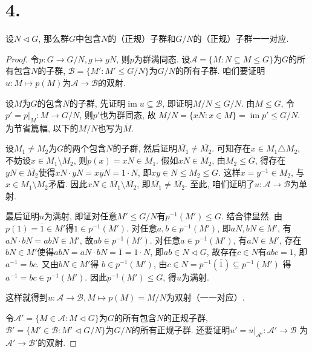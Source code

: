 \documentclass[12pt, a4paper, fontset=windows]{ctexart}
\newcommand{\cl}[1]{\overline{#1}} %
\newcommand{\im}{\operatorname{im}}
\newcommand{\kh}[1]{（{#1}）} %
\begin{document}
\section*{4.}
\label{group-correspond}

设$N\lhd G$, 那么群$G$中包含$N$的\kh{正规}子群和$G/N$的\kh{正规}子群一一对应. 

\begin{proof}
令$p:G\to G/N,g\mapsto gN$, 则$p$为群满同态. 
设$\mathcal{A}=\{M:N\subseteq M\le G\}$为$G$的所有包含$N$的子群, 
$\mathcal{B}=\{M':M'\le G/N\}$为$G/N$的所有子群. 咱们要证明
$u:M\mapsto p(M)$为$\mathcal{A}\to\mathcal{B}$的双射. 

\vspace{1em}

设$M$为$G$的包含$N$的子群, 先证明$\im u\subseteq\mathcal{B}$, 
即证明$M/N\le G/N$. 
由$M\le G$, 令$p'=p|_M:M\to G/N$, 则$p'$也为群同态, 故
$M/N=\{xN:x\in M\}=\im p'\le G/N$. 
为节省篇幅, 以下的$M/N$也写为$\cl{M}$. 

设$M_1\ne M_2$为$G$的两个包含$N$的子群, 然后证明$\cl{M_1}\ne\cl{M_2}$. 
可知存在$x\in M_1\triangle M_2$, 不妨设$x\in M_1\setminus M_2$, 
则$p(x)=xN\in\cl{M_1}$. 假如$xN\in\cl{M_2}$, 由$\cl{M_2}\le\cl{G}$, 
得存在$yN\in\cl{M_2}$使得$xN\cdot yN=xyN=1\cdot N$, 即$xy\in N\le M_2\le G$. 
这样$x=y^{-1}\in M_2$, 与$x\in M_1\setminus M_2$矛盾. 
因此$xN\in\cl{M_1}\setminus\cl{M_2}$, 即$\cl{M_1}\ne\cl{M_2}$. 
至此, 咱们证明了$u:\mathcal{A}\to\mathcal{B}$为单射. 

最后证明$u$为满射, 即证对任意$M'\le G/N$有$p^{-1}(M')\le G$. 
结合律显然. 由$p(1)=\cl{1}\in M'$得$1\in p^{-1}(M')$. 
对任意$a,b\in p^{-1}(M')$, 即$aN,bN\in M'$, 有$aN\cdot bN=abN\in M'$, 
故$ab\in p^{-1}(M')$. 对任意$a\in p^{-1}(M')$, 有$aN\in M'$, 
存在$bN\in M'$使得$abN=aN\cdot bN=\cl{1}=1\cdot N$, 即$ab\in N\lhd G$, 
故存在$c\in N$有$abc=1$, 即$a^{-1}=bc$. 又由$bN\in M'$得
$b\in p^{-1}(M')$, 由$c\in N=p^{-1}(\cl{1})\subseteq p^{-1}(M')$
得$a^{-1}=bc\in p^{-1}(M')$. 因此$p^{-1}(M')\le G$, 得$u$为满射. 

这样就得到$u:\mathcal{A}\to\mathcal{B},M\mapsto p(M)=M/N$为双射\kh{一一对应}. 

\vspace{1em}
令$\mathcal{A}'=\{M\in\mathcal{A}:M\lhd G\}$为$G$的所有包含$N$的正规子群, 
$\mathcal{B}'=\{M'\in\mathcal{B}:M'\lhd G/N\}$为$G/N$的所有正规子群. 
还要证明$u'=u|_{\mathcal{A}'}:\mathcal{A}'\to\mathcal{B}$
为$\mathcal{A}'\to\mathcal{B}'$的双射. 

\vspace{1em}


\end{proof}
\end{document}
